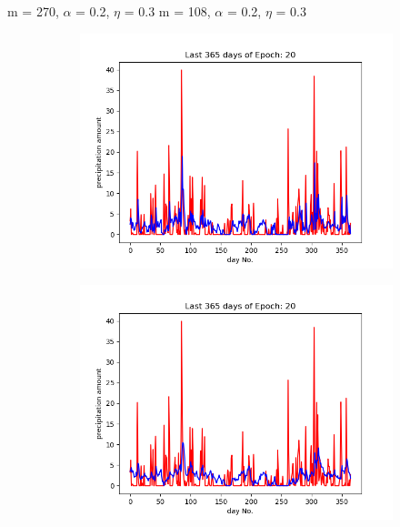 \documentclass{beamer}
\begin{document}
\begin{frame}{\small{m = 270, $\alpha$ = 0.2, $\eta$ = 0.3} \hspace{4cm} \small{m = 108, $\alpha$ = 0.2, $\eta$ = 0.3}}

    \begin{figure}
        \begin{subfigure}{\textwidth}
            \includegraphics[width=0.45\linewidth]{plots/plot_epoch_20_time_11_20_22.png}
        \end{subfigure}
        \begin{subfigure}{\textwidth}
            \includegraphics[width=0.45\linewidth]{plots/plot_epoch_20_time_14_14_49.png}
        \end{subfigure}
       

\end{figure}
\end{frame}
\end{document}
